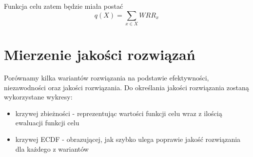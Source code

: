 \documentclass[titlepage]{article}
\begin{document}
            \noindent Funkcja celu zatem będzie miała postać
            \[
                q(X) = \sum_{x \in X} WRR_{x}
            \]

    \section{
        Mierzenie jakości rozwiązań
    }
        Porównamy kilka wariantów rozwiązania na podstawie efektywności, niezawodności oraz jakości rozwiązania. 
        Do określania jakości rozwiązania zostaną wykorzystane wykresy:
        \begin{itemize}
            \item krzywej zbieżności - reprezentując wartości funkcji celu wraz z ilością ewaluacji funkcji celu
            \item krzywej ECDF - obrazującej, jak szybko ulega poprawie jakość rozwiązania dla każdego z wariantów
        \end{itemize}
\end{document}
